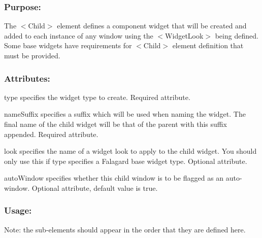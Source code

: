 \hypertarget{fal_element_ref_fal_elem_ref_sec_5_1}{}\subsubsection{Purpose\+:}\label{fal_element_ref_fal_elem_ref_sec_5_1}
The {\ttfamily $<$Child$>$} element defines a component widget that will be created and added to each instance of any window using the {\ttfamily $<$Widget\+Look$>$} being defined. Some base widgets have requirements for {\ttfamily $<$Child$>$} element definition that must be provided.\hypertarget{fal_element_ref_fal_elem_ref_sec_5_2}{}\subsubsection{Attributes\+:}\label{fal_element_ref_fal_elem_ref_sec_5_2}
\begin{DoxyItemize}
\item {\ttfamily type} specifies the widget type to create. Required attribute. \item {\ttfamily name\+Suffix} specifies a suffix which will be used when naming the widget. The final name of the child widget will be that of the parent with this suffix appended. Required attribute. \item {\ttfamily look} specifies the name of a widget look to apply to the child widget. You should only use this if \textquotesingle{}type\textquotesingle{} specifies a Falagard base widget type. Optional attribute. \item {\ttfamily auto\+Window} specifies whether this child window is to be flagged as an auto-\/window. Optional attribute, default value is {\ttfamily true}.\end{DoxyItemize}
\hypertarget{fal_element_ref_fal_elem_ref_sec_5_3}{}\subsubsection{Usage\+:}\label{fal_element_ref_fal_elem_ref_sec_5_3}
Note\+: the sub-\/elements should appear in the order that they are defined here.


